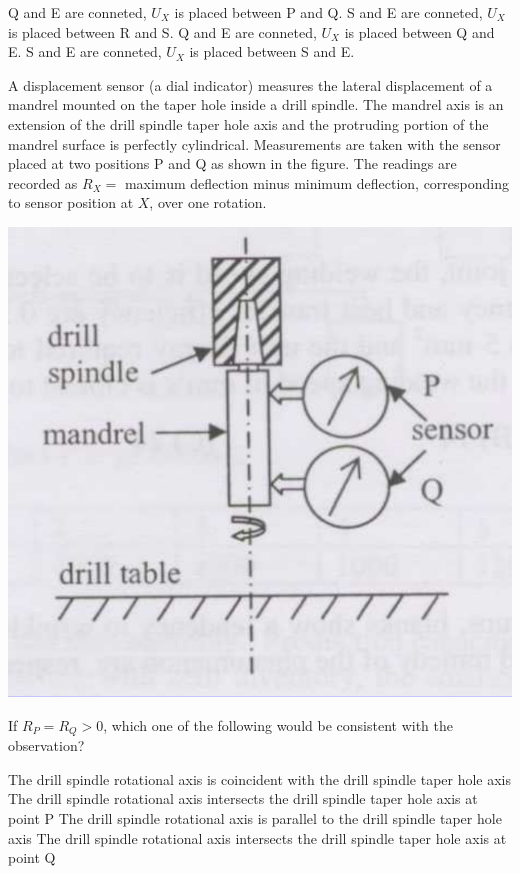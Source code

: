 \documentclass[addpoints,11pt]{exam}
\begin{document}
\begin{questions}
    \begin{choices}
        \choice Q and E are conneted, $U_X$ is placed between P and Q.
        \choice S and E are conneted, $U_X$ is placed between R and S.
        \choice Q and E are conneted, $U_X$ is placed between Q and E.
        \choice S and E are conneted, $U_X$ is placed between S and E.
    \end{choices}

    \question A displacement sensor (a dial indicator) measures the lateral displacement of a mandrel mounted on the taper hole inside a drill spindle. The mandrel axis is an extension of the drill spindle taper hole axis and the protruding portion of the mandrel surface is perfectly cylindrical. Measurements are taken with the sensor placed at two positions P and Q as shown in the figure. The readings are recorded as $R_X = $ maximum deflection minus minimum deflection, corresponding to sensor position at $X$, over one rotation.
    
    \begin{center}
        \includegraphics[scale=0.3]{q70.png}
    \end{center}
    If $R_P=R_Q>0$, which one of the following would be consistent with the observation?

    \begin{choices}
        \choice The drill spindle rotational axis is coincident with the drill spindle taper hole axis
        \choice The drill spindle rotational axis intersects the drill spindle taper hole axis at point P
        \choice The drill spindle rotational axis is parallel to the drill spindle taper hole axis
        \choice The drill spindle rotational axis intersects the drill spindle taper hole axis at point Q
    \end{choices}


\end{questions}
\end{document}
